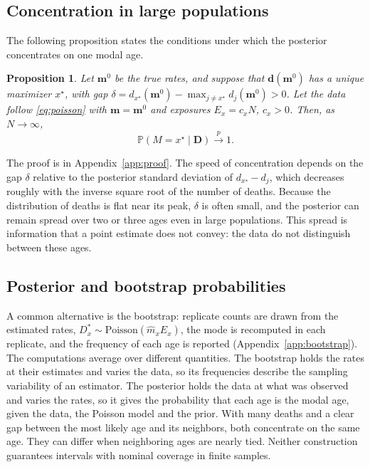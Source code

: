 \documentclass[12pt, letterpaper]{article}
\newtheorem{proposition}{Proposition}
\begin{document}
\subsection{Concentration in large populations}
\label{sec:convergence}

The following proposition states the conditions under which the posterior concentrates on one modal age.

\begin{proposition}
\label{prop:convergence}
Let $\bm{m}^0$ be the true rates, and suppose that $\bm{d}(\bm{m}^0)$ has a unique maximizer $x^\star$, with gap $\delta = d_{x^\star}(\bm{m}^0) - \max_{j \neq x^\star} d_j(\bm{m}^0) > 0$. Let the data follow \eqref{eq:poisson} with $\bm{m} = \bm{m}^0$ and exposures $E_x = c_x N$, $c_x > 0$. Then, as $N \to \infty$,
\[
\mathbb{P}(M = x^\star \mid \bm{D}) \xrightarrow{\;p\;} 1 .
\]
\end{proposition}

The proof is in Appendix~\ref{app:proof}. The speed of concentration depends on the gap $\delta$ relative to the posterior standard deviation of $d_{x^\star} - d_j$, which decreases roughly with the inverse square root of the number of deaths. Because the distribution of deaths is flat near its peak, $\delta$ is often small, and the posterior can remain spread over two or three ages even in large populations. This spread is information that a point estimate does not convey: the data do not distinguish between these ages.

\subsection{Posterior and bootstrap probabilities}
\label{sec:why_posterior}

A common alternative is the bootstrap: replicate counts are drawn from the estimated rates, $D_x^\ast \sim \text{Poisson}(\hat m_x E_x)$, the mode is recomputed in each replicate, and the frequency of each age is reported (Appendix~\ref{app:bootstrap}). The computations average over different quantities. The bootstrap holds the rates at their estimates and varies the data, so its frequencies describe the sampling variability of an estimator. The posterior holds the data at what was observed and varies the rates, so it gives the probability that each age is the modal age, given the data, the Poisson model and the prior. With many deaths and a clear gap between the most likely age and its neighbors, both concentrate on the same age. They can differ when neighboring ages are nearly tied. Neither construction guarantees intervals with nominal coverage in finite samples.
\end{document}
